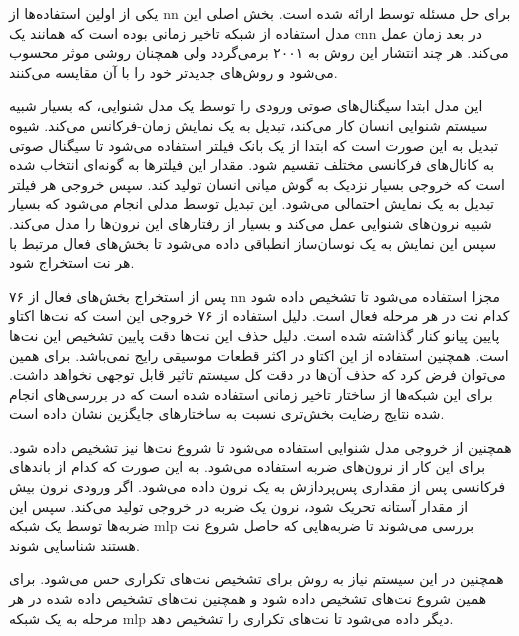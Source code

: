 یکی از اولین استفاده‌ها از \gls{nn} برای حل مسئله توسط
\cite{marolt2004connectionist} ارائه شده است. بخش اصلی این مدل استفاده از شبکه
تاخیر زمانی بوده است که همانند یک \gls{cnn} در بعد زمان عمل می‌کند. هر چند
انتشار این روش به ۲۰۰۱ برمی‌گردد ولی همچنان روشی موثر محسوب می‌شود و روش‌های
جدیدتر خود را با آن مقایسه می‌کنند.

این مدل ابتدا سیگنال‌های صوتی ورودی را توسط یک مدل شنوایی، که بسیار شبیه سیستم
شنوایی انسان کار می‌کند، تبدیل به یک نمایش زمان-فرکانس می‌کند. شیوه تبدیل به این
صورت است که ابتدا از یک بانک فیلتر استفاده می‌شود تا سیگنال صوتی به کانال‌های
فرکانسی مختلف تقسیم شود. مقدار این فیلترها به گونه‌ای انتخاب شده است که خروجی
بسیار نزدیک به گوش میانی انسان تولید کند. سپس خروجی هر فیلتر تبدیل به یک نمایش
احتمالی می‌شود. این تبدیل توسط مدلی انجام می‌شود که بسیار شبیه نرون‌های شنوایی
عمل می‌کند و بسیار از رفتارهای این نرون‌ها را مدل می‌کند. سپس این نمایش به یک
نوسان‌ساز انطباقی داده می‌شود تا بخش‌های فعال مرتبط با هر نت استخراج شود.

پس از استخراج بخش‌های فعال از ۷۶ \gls{nn} مجزا استفاده می‌شود تا تشخیص داده شود
کدام نت در هر مرحله فعال است. دلیل استفاده از ۷۶ خروجی این است که نت‌ها اکتاو
پایین پیانو کنار گذاشته شده است. دلیل حذف این نت‌ها دقت پایین تشخیص  این نت‌ها
است. همچنین استفاده از این اکتاو در اکثر قطعات موسیقی رایج نمی‌باشد. برای همین
می‌توان فرض کرد که حذف آن‌ها در دقت کل سیستم تاثیر قابل توجهی نخواهد داشت. برای
این شبکه‌ها از ساختار تاخیر زمانی استفاده شده است که در بررسی‌های انجام شده
نتایج رضایت بخش‌تری نسبت به ساختارهای جایگزین نشان داده است.

همچنین از خروجی مدل شنوایی استفاده می‌شود تا شروع نت‌ها نیز تشخیص داده شود. برای
این کار از نرون‌های ضربه استفاده می‌شود. به این صورت که کدام از باندهای فرکانسی
پس از مقداری پس‌پردازش به یک نرون داده می‌شود. اگر ورودی نرون بیش از مقدار
آستانه تحریک شود، نرون یک ضربه در خروجی تولید می‌کند. سپس این ضربه‌ها توسط یک
شبکه \gls{mlp} بررسی می‌شوند تا ضربه‌هایی که حاصل شروع نت هستند شناسایی شوند.

همچنین در این سیستم نیاز به روش برای تشخیص نت‌های تکراری حس می‌شود. برای همین
شروع نت‌های تشخیص داده شود و همچنین نت‌های تشخیص داده شده در هر مرحله به یک شبکه
\gls{mlp} دیگر داده می‌شود تا نت‌های تکراری را تشخیص دهد.

